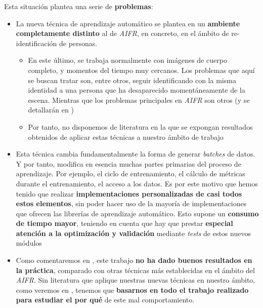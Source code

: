 Esta situación plantea una serie de \textbf{problemas}:

\begin{itemize}
    \item La nueva técnica de aprendizaje automático se plantea en un \textbf{ambiente completamente distinto} al de \textit{AIFR}, en concreto, en el ámbito de re-identificación de personas.
        \begin{itemize}
            \item En este último, se trabaja normalmente con imágenes de cuerpo completo, y momentos del tiempo muy cercanos. Los problemas que aquí se buscan tratar son, entre otros, seguir identificando con la misma identidad a una persona que ha desaparecido momentáneamente de la escena. Mientras que los problemas principales en \textit{AIFR} son otros (y se detallarán en )
            \item Por tanto, no disponemos de literatura en la que se expongan resultados obtenidos de aplicar estas técnicas a nuestro ámbito de trabajo
        \end{itemize}
    \item Esta técnica cambia fundamentalmente la forma de generar \textit{batches} de datos. Y por tanto, modifica en esencia muchas partes primarias del proceso de aprendizaje. Por ejemplo, el ciclo de entrenamiento, el cálculo de métricas durante el entrenamiento, el acceso a los datos. Es por este motivo que hemos tenido que realizar \textbf{implementaciones personalizadas de casi todos estos elementos}, sin poder hacer uso de la mayoría de implementaciones que ofrecen las librerías de aprendizaje automático. Esto supone un \textbf{consumo de tiempo mayor}, teniendo en cuenta que hay que prestar \textbf{especial atención a la optimización y validación} mediante \textit{tests} de estos nuevos módulos
    \item Como comentaremos en , este trabajo \textbf{no ha dado buenos resultados en la práctica}, comparado con otras técnicas más establecidas en el ámbito del \textit{AIFR}. Sin literatura que aplique nuestras nuevas técnicas en nuestro ámbito, como veremos en , tenemos que \textbf{basarnos en todo el trabajo realizado para estudiar el por qué} de este mal comportamiento.
\end{itemize}

